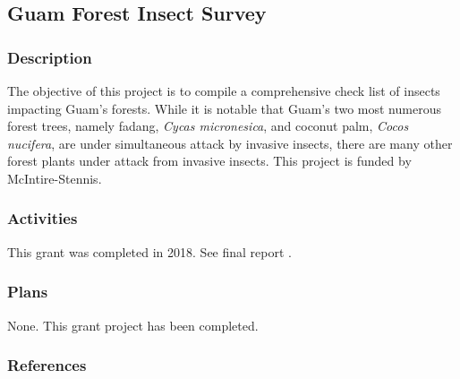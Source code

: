 \subsection{Guam Forest Insect Survey}
\begin{refsection}
	
	\subsubsection{Description}
	
	The objective of this project is to compile a comprehensive check
	list of insects impacting Guam's forests. While it is notable that
	Guam's two most numerous forest trees, namely fadang, \emph{Cycas
		micronesica}, and coconut palm, \emph{Cocos nucifera}, are under simultaneous
	attack by invasive insects, there are many other forest plants under
	attack from invasive insects. This project is funded by McIntire-Stennis.
	
	\subsubsection{Activities}
	
	This grant was completed in 2018. See final report \cite{moore_aubreymoore/mcintire-stennis_2018}.
		
	\subsubsection{Plans}
	
	None. This grant project has been completed.
	
	\subsubsection{References}
	\printbibliography[heading=none]
\end{refsection}


